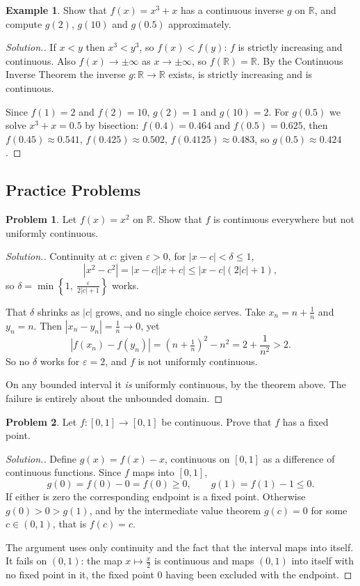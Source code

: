 \documentclass[11pt,a4paper]{article}
\numberwithin{equation}{section}
\theoremstyle{definition}
\newtheorem{exa}[thm]{Example}
\newtheorem{problemx}{Problem}[subsection]
\newenvironment{problem}{\begin{problemx}}{\end{problemx}}
\newenvironment{solution}
  {\renewcommand{\qedsymbol}{}\begin{proof}[\textit{Solution}.]}
  {\end{proof}}
\begin{document}
\begin{exa}
Show that $f(x) = x^3+x$ has a continuous inverse $g$ on $\mathbb{R}$, and compute $g(2)$, $g(10)$ and $g(0.5)$ approximately.
\end{exa}

\begin{solution}
If $x<y$ then $x^3<y^3$, so $f(x)<f(y)$: $f$ is strictly increasing and continuous. Also $f(x)\longrightarrow\pm\infty$ as $x\longrightarrow\pm\infty$, so $f(\mathbb{R}) = \mathbb{R}$. By the Continuous Inverse Theorem the inverse $g:\mathbb{R}\longrightarrow\mathbb{R}$ exists, is strictly increasing and is continuous.

Since $f(1) = 2$ and $f(2) = 10$, $g(2) = 1$ and $g(10) = 2$. For $g(0.5)$ we solve $x^3+x = 0.5$ by bisection: $f(0.4) = 0.464$ and $f(0.5) = 0.625$, then $f(0.45) \approx 0.541$, $f(0.425)\approx 0.502$, $f(0.4125)\approx0.483$, so $g(0.5)\approx 0.424$.
\end{solution}


\subsection{Practice Problems}

\begin{problem}
Let $f(x) = x^{2}$ on $\mathbb{R}$. Show that $f$ is continuous everywhere but
not uniformly continuous.
\end{problem}
\begin{solution}
Continuity at $c$: given $\varepsilon>0$, for $|x-c|<\delta\leq1$,
$$|x^{2}-c^{2}| = |x-c||x+c|
\leq |x-c|(2|c|+1),$$
so $\delta = \min\left\{1,\ \frac{\varepsilon}{2|c|+1}\right\}$ works.

That $\delta$ shrinks as $|c|$ grows, and no single choice serves.
Take $x_n = n + \tfrac1n$ and $y_n = n$. Then
$|x_n-y_n| = \tfrac1n\rightarrow0$, yet
$$|f(x_n)-f(y_n)| = (n+\tfrac1n)^{2}-n^{2}
= 2 + \frac{1}{n^{2}} > 2 .$$
So no $\delta$ works for $\varepsilon = 2$, and $f$ is not uniformly continuous.

On any bounded interval it \emph{is} uniformly continuous, by the theorem above.
The failure is entirely about the unbounded domain.
\end{solution}

\begin{problem}
Let $f:[0,1]\rightarrow[0,1]$ be continuous. Prove that $f$ has a fixed point.
\end{problem}
\begin{solution}
Define $g(x) = f(x)-x$, continuous on $[0,1]$ as a difference of continuous
functions. Since $f$ maps into $[0,1]$,
$$g(0) = f(0)-0 = f(0) \geq 0,\qquad g(1) = f(1)-1 \leq 0 .$$
If either is zero the corresponding endpoint is a fixed point. Otherwise
$g(0)>0>g(1)$, and by the intermediate value theorem $g(c)=0$ for some
$c\in(0,1)$, that is $f(c)=c$.

The argument uses only continuity and the fact that the interval maps into
itself. It fails on $(0,1)$: the map $x\mapsto \frac{x}{2}$ is continuous and maps
$(0,1)$ into itself with no fixed point in it, the fixed point $0$ having been
excluded with the endpoint.
\end{solution}
\end{document}
